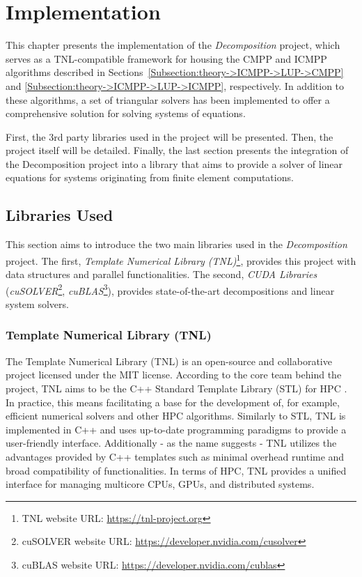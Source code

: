 \chapter{Implementation}\label{Chapter:implementation}
This chapter presents the implementation of the \textit{Decomposition} project, which serves as a TNL-compatible framework for housing the CMPP and ICMPP algorithms described in Sections~\ref{Subsection:theory->ICMPP->LUP->CMPP} and \ref{Subsection:theory->ICMPP->LUP->ICMPP}, respectively.
In addition to these algorithms, a set of triangular solvers has been implemented to offer a comprehensive solution for solving systems of equations.

First, the 3rd party libraries used in the project will be presented.
Then, the project itself will be detailed.
Finally, the last section presents the integration of the Decomposition project into a library that aims to provide a solver of linear equations for systems originating from finite element computations.

\section{Libraries Used}\label{Section:implementation->libraries-used}
This section aims to introduce the two main libraries used in the \textit{Decomposition} project.
The first, \textit{Template Numerical Library (TNL)}\footnote{TNL website URL: \url{https://tnl-project.org}}, provides this project with data structures and parallel functionalities.
The second, \textit{CUDA Libraries} (\textit{cuSOLVER}\footnote{cuSOLVER website URL: \url{https://developer.nvidia.com/cusolver}}, \textit{cuBLAS}\footnote{cuBLAS website URL: \url{https://developer.nvidia.com/cublas}}), provides state-of-the-art decompositions and linear system solvers.

\subsection{Template Numerical Library (TNL)}\label{Subsection:implementation->libraries-used->TNL}
The Template Numerical Library (TNL) \cite{Oberhuber2021, Klinkovsky2022} is an open-source and collaborative project licensed under the MIT license.
According to the core team behind the project, TNL aims to be the C++ Standard Template Library (STL) for HPC \cite{prXEEmGjoxB89XBn}.
In practice, this means facilitating a base for the development of, for example, efficient numerical solvers and other HPC algorithms.
Similarly to STL, TNL is implemented in C++ and uses up-to-date programming paradigms to provide a user-friendly interface.
Additionally - as the name suggests - TNL utilizes the advantages provided by C++ templates such as minimal overhead runtime and broad compatibility of functionalities.
In terms of HPC, TNL provides a unified interface for managing multicore CPUs, GPUs, and distributed systems.

